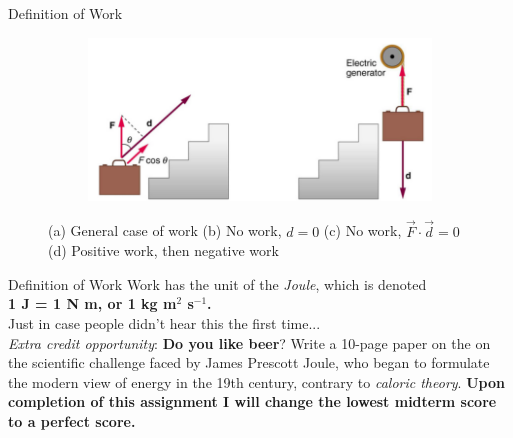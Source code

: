 \documentclass{beamer}
\begin{document}
\begin{frame}{Definition of Work}
\begin{figure}
\begin{subfigure}{0.2\textwidth}
\caption{}
\end{subfigure}
\begin{subfigure}{0.45\textwidth}
\centering
\includegraphics[width=\textwidth]{figures/lawn3.png}
\caption{}
\end{subfigure}
\caption{\label{fig:workvisual}\small (a) General case of work (b) No work, $d=0$ (c) No work, $\vec{F}\cdot\vec{d}=0$ (d) Positive work, then negative work}
\end{figure}
\end{frame}

\begin{frame}{Definition of Work}
Work has the unit of the \textit{Joule}, which is denoted \\ \textbf{1 J = 1 N m, or 1 kg m$^2$ s$^{-1}$.} \\  \vspace{1cm}
\small
\alert{Just in case people didn't hear this the first time...}\\
\textit{Extra credit opportunity}: \textbf{Do you like beer}?  Write a 10-page paper on the on the scientific challenge faced by James Prescott Joule, who began to formulate the modern view of energy in the 19th century, contrary to \textit{caloric theory}.  \textbf{Upon completion of this assignment I will change the lowest midterm score to a perfect score.}
\end{frame}
\end{document}
